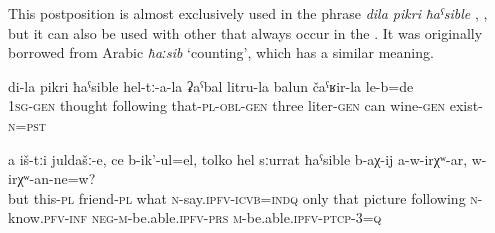 This postposition is almost exclusively used in the phrase \textit{dila pikri} \textit{ħaˁsible}  , , but it can also be used with other  that always occur in the  . It was originally borrowed from Arabic \textit{ħaːsib} `counting', which has a similar meaning.
%
\begin{exe}
	\ex
	\begin{xlist}
		\ex	\label{In my mind there was their 3-litre can with wine}
		\gll	di-la	pikri	ħaˁsible	hel-tː-a-la	ʡaˁbal	litru-la	balun	čaˁʁir-la le-b=de\\
			1\textsc{sg}-\textsc{gen}	thought	following	that-\textsc{pl}-\textsc{obl}-\textsc{gen}	three	liter-\textsc{gen} can	wine-\textsc{gen}	exist-\textsc{n}=\textsc{pst}\\
		\glt	{}

		\ex	\label{And these friends, what they are saying, only by means of the picture, (one) cannot know, can}
		\gll	a	iš-tːi	juldašː-e,	ce	b-ik'-ul=el,	tolko	hel	sːurrat	ħaˁsible	b-aχ-ij	a-w-irχʷ-ar,	w-irχʷ-an-ne=w?\\
			but	this-\textsc{pl}	friend-\textsc{pl}	what	\textsc{n}-say.\textsc{ipfv}-\textsc{icvb}=\textsc{indq}	only	that	picture	following	\textsc{n}-know.\textsc{pfv}-\textsc{inf}	\textsc{neg}-\textsc{m}-be.able.\textsc{ipfv}-\textsc{prs}	\textsc{m}-be.able.\textsc{ipfv}-\textsc{ptcp-3=q}\\
		\glt	{}
	\end{xlist}
\end{exe}

